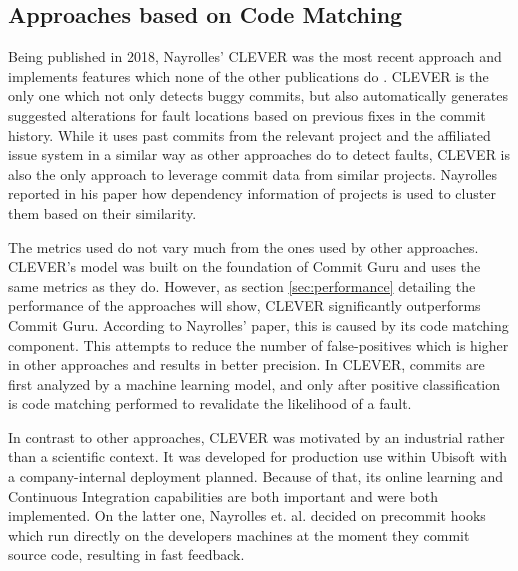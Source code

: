 \subsection{Approaches based on Code Matching}%
\label{sec:codematching}
\label{sec:comparison-codematching}

Being published in 2018, Nayrolles' CLEVER was the most recent approach and implements features which none of the other publications do \cite{Nayrolles2018}. CLEVER is the only one which not only detects buggy commits, but also automatically generates suggested alterations for fault locations based on previous fixes in the commit history. While it uses past commits from the relevant project and the affiliated issue system in a similar way as other approaches do to detect faults, CLEVER is also the only approach to leverage commit data from similar projects. Nayrolles reported in his paper how dependency information of projects is used to cluster them based on their similarity.

The metrics used do not vary much from the ones used by other approaches. CLEVER's model was built on the foundation of Commit Guru and uses the same metrics as they do. However, as section \ref{sec:performance} detailing the performance of the approaches will show, CLEVER significantly outperforms Commit Guru. According to Nayrolles' paper, this is caused by its code matching component. This attempts to reduce the number of false-positives which is higher in other approaches and results in better precision. In CLEVER, commits are first analyzed by a machine learning model, and only after positive classification is code matching performed to revalidate the likelihood of a fault.

In contrast to other approaches, CLEVER was motivated by an industrial rather than a scientific context. It was developed for production use within Ubisoft with a company-internal deployment planned. Because of that, its online learning and Continuous Integration capabilities are both important and were both implemented. On the latter one, Nayrolles et. al. decided on precommit hooks which run directly on the developers machines at the moment they commit source code, resulting in fast feedback.


